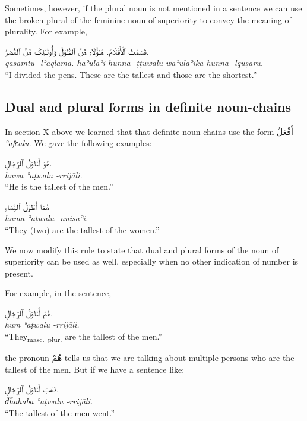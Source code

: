 \documentclass[
  10pt,
]{book}
\begin{document}
Sometimes, however, if the plural noun is not mentioned in a sentence we can use the broken plural of the feminine noun of superiority to convey the meaning of plurality. For example,

\foreignlanguage{arabic}{قَسَمْتُ ٱلْأَقْلَامَ. هَـٰؤُلَاءِ هُنَّ ٱلطُّوَلُ وَأُولَـٰئِکَ هُنَّ ٱلقُصَرُ.}\\
\emph{qasamtu -lʾaqlāma. hāʾulāʾi hunna -ṭṭuwalu waʾulāʾika hunna -lquṣaru.}\\
\enquote{I divided the pens. These are the tallest and those are the shortest.}

\subsection{Dual and plural forms in definite noun-chains}\label{dual-and-plural-forms-in-definite-noun-chains}

In section X above we learned that that definite noun-chains use the form \foreignlanguage{arabic}{أَفْعَلُ} \emph{ʾafɛalu}. We gave the following examples:

\foreignlanguage{arabic}{هُوَ أَطْوَلُ ٱلرِّجَالِ.}\\
\emph{huwa ʾaṭwalu -rrijāli.}\\
\enquote{He is the tallest of the men.}

\foreignlanguage{arabic}{هُمَا أَطْوَلُ ٱلنِّسَاءِ}\\
\emph{humā ʾaṭwalu -nnisāʾi.}\\
\enquote{They (two) are the tallest of the women.}

We now modify this rule to state that dual and plural forms of the noun of superiority can be used as well, especially when no other indication of number is present.

For example, in the sentence,

\foreignlanguage{arabic}{هُمْ أَطْوَلُ ٱلرِّجَالِ.}\\
\emph{hum ʾaṭwalu -rrijāli.}\\
\enquote{They\textsubscript{masc.~plur.} are the tallest of the men.}

the pronoun \foreignlanguage{arabic}{هُمْ} tells us that we are talking about multiple persons who are the tallest of the men. But if we have a sentence like:

\foreignlanguage{arabic}{ذَهَبَ أَطْوَلُ ٱلرِّجَالِ.}\\
\emph{d͡hahaba ʾaṭwalu -rrijāli.}\\
\enquote{The tallest of the men went.}
\end{document}
